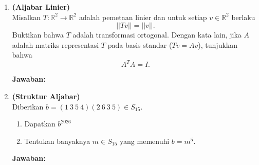 \documentclass[12pt,a4paper]{article}
\begin{document}
\begin{enumerate}
        \textbf{Jawaban:}
        \par\vspace{0.1cm}\noindent
        \fbox{%
          \begin{minipage}[t][\dimexpr\textheight-\pagetotal-2.5cm\relax]{\dimexpr\linewidth-2\fboxsep-2\fboxrule\relax}
            \mbox{}
          \end{minipage}%
        }

        \newpage

  \item \textbf{(Aljabar Linier)}\\
        Misalkan $T:\mathbb{R}^{2} \rightarrow \mathbb{R}^{2}$ adalah pemetaan linier dan untuk setiap $v \in \mathbb{R}^{2}$ berlaku
        \[ ||Tv|| = ||v||. \]
        Buktikan bahwa $T$ adalah transformasi ortogonal. Dengan kata lain, jika $A$ adalah matriks representasi $T$ pada basis standar ($Tv=Av$), tunjukkan bahwa
        \[ A^{T}A = I. \]


        \textbf{Jawaban:}
        \par\vspace{0.1cm}\noindent
        \fbox{%
          \begin{minipage}[t][\dimexpr\textheight-\pagetotal-2.5cm\relax]{\dimexpr\linewidth-2\fboxsep-2\fboxrule\relax}
            \mbox{}
          \end{minipage}%
        }

        \newpage

  \item \textbf{(Struktur Aljabar)}\\
        Diberikan $b=(1~3~5~4)(2~6~3~5) \in S_{15}$.
        \begin{enumerate}
          \item Dapatkan $b^{2026}$
          \item Tentukan banyaknya $m \in S_{15}$ yang memenuhi $b=m^{5}$.
        \end{enumerate}


        \textbf{Jawaban:}
        \par\vspace{0.1cm}\noindent
        \fbox{%
          \begin{minipage}[t][\dimexpr\textheight-\pagetotal-2.5cm\relax]{\dimexpr\linewidth-2\fboxsep-2\fboxrule\relax}
            \mbox{}
          \end{minipage}%
        }


\end{enumerate}
\end{document}
